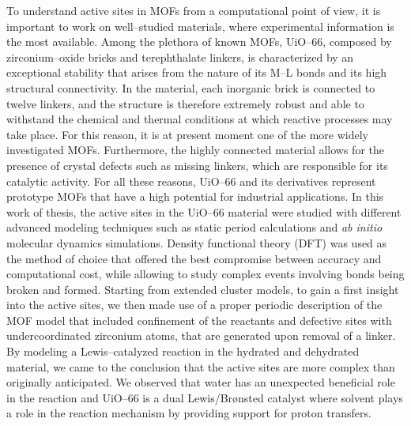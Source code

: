 \npar
To understand active sites in MOFs from a computational point of view, it is important to work on well--studied materials, where experimental information is the most available. Among the plethora of known MOFs, UiO--66, composed by zirconium--oxide bricks and terephthalate linkers, is characterized by an exceptional stability that arises from the nature of its M--L bonds and its high structural connectivity. In the material, each inorganic brick is connected to twelve linkers, and the structure is therefore extremely robust and able to withstand the chemical and thermal conditions at which reactive processes may take place. For this reason, it is at present moment one of the more widely investigated MOFs. Furthermore, the highly connected material allows for the presence of crystal defects such as missing linkers, which are responsible for its catalytic activity. For all these reasons, UiO--66 and its derivatives represent prototype MOFs that have a high potential for industrial applications. 
\npar
In this work of thesis, the active sites in the UiO--66 material were studied with different advanced modeling techniques such as static period calculations and \textit{ab initio} molecular dynamics simulations. Density functional theory (DFT) was used as the method of choice that offered the best compromise between accuracy and computational cost, while allowing to study complex events involving bonds being broken and formed. Starting from extended cluster models, to gain a first insight into the active sites, we then made use of a proper periodic description of the MOF model that included confinement of the reactants and defective sites with undercoordinated zirconium atoms, that are generated upon removal of a linker. By modeling a Lewis--catalyzed reaction in the hydrated and dehydrated material, we came to the conclusion that the active sites are more complex than originally anticipated. We observed that water has an unexpected beneficial role in the reaction and UiO--66 is a dual Lewis/Br\o{}nsted catalyst where solvent plays a role in the reaction mechanism by providing support for proton transfers. 
\npar
